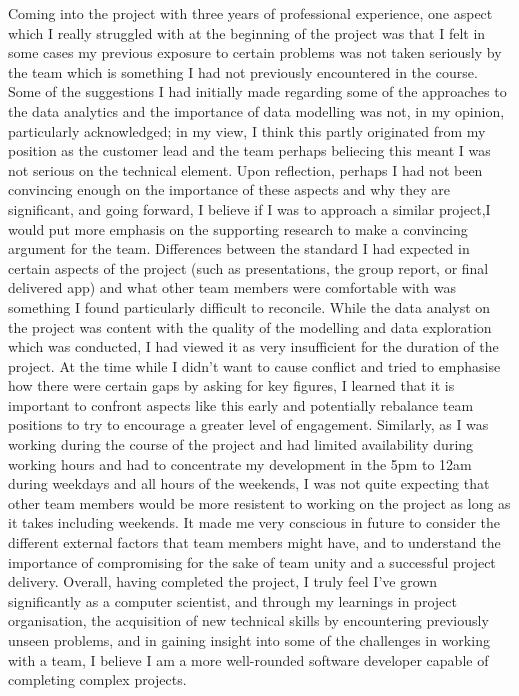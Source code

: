 \documentclass{scrreprt}
\begin{document}
\newline
\newline
Coming into the project with three years of professional experience, one aspect which I really struggled with at the beginning of the project was that I felt in some cases my previous exposure to certain problems was not taken seriously by the team which is something I had not previously encountered in the course. Some of the suggestions I had initially made regarding some of the approaches to the data analytics and the importance of data modelling was not, in my opinion, particularly acknowledged; in my view, I think this partly originated from my position as the customer lead and the team perhaps beliecing this meant I was not serious on the technical element. Upon reflection, perhaps I had not been convincing enough on the importance of these aspects and why they are significant, and going forward, I believe if I was to approach a similar project,I would put more emphasis on the supporting research to make a convincing argument for the team.
\newline
\newline 
Differences between the standard I had expected in certain aspects of the project (such as presentations, the group report, or final delivered app) and what other team members were comfortable with was something I found particularly difficult to reconcile. While the data analyst on the project was content with the quality of the modelling and data exploration which was conducted, I had viewed it as very insufficient for the duration of the project. At the time while I didn't want to cause conflict and tried to emphasise how there were certain gaps by asking for key figures, I learned that it is important to confront aspects like this early and potentially rebalance team positions to try to encourage a greater level of engagement. Similarly, as I was working during the course of the project and had limited availability during working hours and had to concentrate my development in the 5pm to 12am during weekdays and all hours of the weekends, I was not quite expecting that other team members would be more resistent to working on the project as long as it takes including weekends. It made me very conscious in future to consider the different external factors that team members might have, and to understand the importance of compromising for the sake of team unity and a successful project delivery.
\newline
\newline
Overall, having completed the project, I truly feel I've grown significantly as a computer scientist, and through my learnings in project organisation, the acquisition of new technical skills by encountering previously unseen problems, and in gaining insight into some of the challenges in working with a team, I believe I am a more well-rounded software developer capable of completing complex projects.
\end{document}
